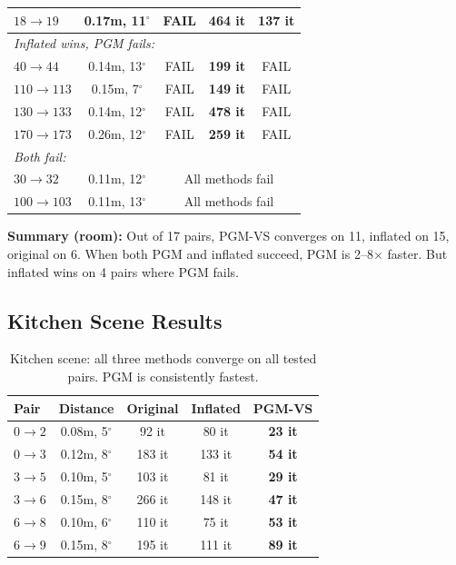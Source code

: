 \documentclass[11pt]{article}
\begin{document}
\begin{table}[h!]
\begin{tabular}{lc|ccc}
$18 \to 19$   & 0.17m, 11$^\circ$ & FAIL    & 464 it  & \textbf{137 it} \\
\midrule
\multicolumn{5}{l}{\emph{Inflated wins, PGM fails:}} \\
$40 \to 44$   & 0.14m, 13$^\circ$ & FAIL    & \textbf{199 it}  & FAIL \\
$110 \to 113$ & 0.15m, 7$^\circ$  & FAIL    & \textbf{149 it}  & FAIL \\
$130 \to 133$ & 0.14m, 12$^\circ$ & FAIL    & \textbf{478 it}  & FAIL \\
$170 \to 173$ & 0.26m, 12$^\circ$ & FAIL    & \textbf{259 it}  & FAIL \\
\midrule
\multicolumn{5}{l}{\emph{Both fail:}} \\
$30 \to 32$   & 0.11m, 12$^\circ$ & \multicolumn{3}{c}{All methods fail} \\
$100 \to 103$ & 0.11m, 13$^\circ$ & \multicolumn{3}{c}{All methods fail} \\
\bottomrule
\end{tabular}
\end{table}

\textbf{Summary (room):} Out of 17 pairs, PGM-VS converges on 11, inflated on 15, original on 6. When both PGM and inflated succeed, PGM is 2--8$\times$ faster. But inflated wins on 4 pairs where PGM fails.

\subsection{Kitchen Scene Results}

\begin{table}[h!]
\centering
\caption{Kitchen scene: all three methods converge on all tested pairs. PGM is consistently fastest.}
\label{tab:pgm_kitchen}
\begin{tabular}{lc|ccc}
\toprule
\textbf{Pair} & \textbf{Distance} & \textbf{Original} & \textbf{Inflated} & \textbf{PGM-VS} \\
\midrule
$0 \to 2$   & 0.08m, 5$^\circ$ & 92 it   & 80 it   & \textbf{23 it}  \\
$0 \to 3$   & 0.12m, 8$^\circ$ & 183 it  & 133 it  & \textbf{54 it}  \\
$3 \to 5$   & 0.10m, 5$^\circ$ & 103 it  & 81 it   & \textbf{29 it}  \\
$3 \to 6$   & 0.15m, 8$^\circ$ & 266 it  & 148 it  & \textbf{47 it}  \\
$6 \to 8$   & 0.10m, 6$^\circ$ & 110 it  & 75 it   & \textbf{53 it}  \\
$6 \to 9$   & 0.15m, 8$^\circ$ & 195 it  & 111 it  & \textbf{89 it}  \\
\bottomrule
\end{tabular}
\end{table}
\end{document}
